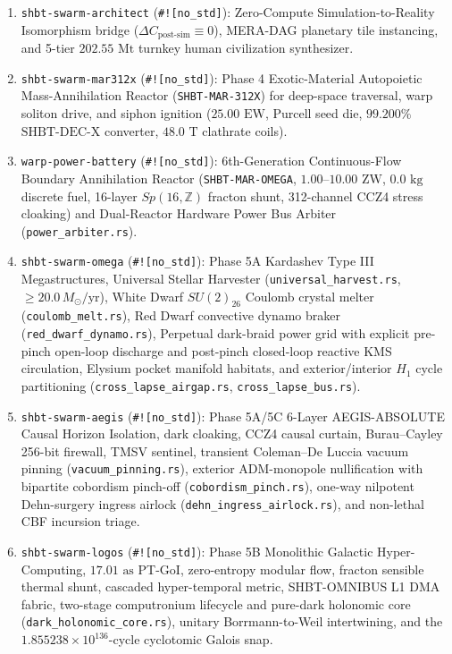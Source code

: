 \documentclass[11pt,onecolumn]{article}
\begin{document}
\begin{enumerate}
    \item \texttt{shbt-swarm-architect} (\texttt{\#![no\_std]}): Zero-Compute Simulation-to-Reality Isomorphism bridge ($\Delta C_{\text{post-sim}} \equiv 0$), MERA-DAG planetary tile instancing, and 5-tier $202.55\text{ Mt}$ turnkey human civilization synthesizer.
    \item \texttt{shbt-swarm-mar312x} (\texttt{\#![no\_std]}): Phase 4 Exotic-Material Autopoietic Mass-Annihilation Reactor (\texttt{SHBT-MAR-312X}) for deep-space traversal, warp soliton drive, and siphon ignition ($25.00\text{ EW}$, Purcell seed die, $99.200\%$ $\text{SHBT-DEC-X}$ converter, $48.0\text{ T}$ clathrate coils).
    \item \texttt{warp-power-battery} (\texttt{\#![no\_std]}): 6th-Generation Continuous-Flow Boundary Annihilation Reactor (\texttt{SHBT-MAR-OMEGA}, $1.00\text{--}10.00\text{ ZW}$, $0.0\text{ kg}$ discrete fuel, 16-layer $Sp(16,\mathbb{Z})$ fracton shunt, 312-channel CCZ4 stress cloaking) and Dual-Reactor Hardware Power Bus Arbiter (\texttt{power\_arbiter.rs}).
    \item \texttt{shbt-swarm-omega} (\texttt{\#![no\_std]}): Phase 5A Kardashev Type III Megastructures, Universal Stellar Harvester (\texttt{universal\_harvest.rs}, $\ge 20.0\,M_\odot/\text{yr}$), White Dwarf $SU(2)_{26}$ Coulomb crystal melter (\texttt{coulomb\_melt.rs}), Red Dwarf convective dynamo braker (\texttt{red\_dwarf\_dynamo.rs}), Perpetual dark-braid power grid with explicit pre-pinch open-loop discharge and post-pinch closed-loop reactive KMS circulation, Elysium pocket manifold habitats, and exterior/interior $H_1$ cycle partitioning (\texttt{cross\_lapse\_airgap.rs}, \texttt{cross\_lapse\_bus.rs}).
    \item \texttt{shbt-swarm-aegis} (\texttt{\#![no\_std]}): Phase 5A/5C 6-Layer AEGIS-ABSOLUTE Causal Horizon Isolation, dark cloaking, CCZ4 causal curtain, Burau--Cayley 256-bit firewall, TMSV sentinel, transient Coleman--De Luccia vacuum pinning (\texttt{vacuum\_pinning.rs}), exterior ADM-monopole nullification with bipartite cobordism pinch-off (\texttt{cobordism\_pinch.rs}), one-way nilpotent Dehn-surgery ingress airlock (\texttt{dehn\_ingress\_airlock.rs}), and non-lethal CBF incursion triage.
    \item \texttt{shbt-swarm-logos} (\texttt{\#![no\_std]}): Phase 5B Monolithic Galactic Hyper-Computing, $17.01\text{ as}$ PT-GoI, zero-entropy modular flow, fracton sensible thermal shunt, cascaded hyper-temporal metric, SHBT-OMNIBUS L1 DMA fabric, two-stage computronium lifecycle and pure-dark holonomic core (\texttt{dark\_holonomic\_core.rs}), unitary Borrmann-to-Weil intertwining, and the $1.855238\times10^{136}$-cycle cyclotomic Galois snap.

\end{enumerate}
\end{document}
